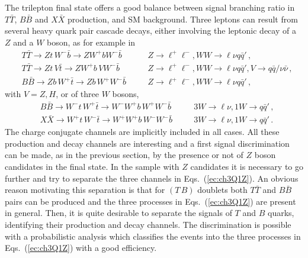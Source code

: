 \documentclass[12pt,a4paper]{article}
\newcommand{\TT}{T \bar T}
\newcommand{\BB}{B \bar B}
\newcommand{\XX}{X \bar X}
\newcommand{\HZ}{V}
\newcommand{\TB}{(T \, B)}
\begin{document}
The trilepton final state offers a good balance between signal branching ratio in $\TT$, $\BB$ and $\XX$ production, and SM background. Three leptons can result from several heavy quark pair cascade decays, either involving the leptonic decay of a $Z$ and a $W$ boson, as for example in
\begin{align}
& T \bar T \to Zt \, W^- \bar b \to Z W^+b W^- \bar b
&& \quad Z \to \ell^+ \ell^- , WW \to \ell \nu q \bar q' \,, \nonumber \\
& T \bar T \to Zt \, \HZ \bar t \to Z W^+b \, \HZ W^- \bar b
&& \quad Z \to \ell^+ \ell^- , WW \to \ell \nu q \bar q' , \HZ \to q \bar q/\nu \bar \nu \,, \nonumber \\
& B \bar B \to Z b \, W^+ \bar t \to Z b \, W^+ W^- \bar b
&& \quad Z \to \ell^+ \ell^- , WW \to \ell \nu q \bar q' \,, 
\label{ec:ch3Q1Z}
\end{align}
with $\HZ=Z,H$, or of three $W$ bosons,
\begin{align}
& B \bar B \to W^- t \, W^+ \bar t \to W^- W^+ b \, W^+ W^- \bar b
&& \quad 3W \to \ell \nu , 1W \to q \bar q' \,, \nonumber \\
& X \bar X \to W^+ t \, W^- \bar t \to W^+ W^+ b \, W^- W^- \bar b 
&& \quad 3W \to \ell \nu , 1W \to q \bar q' \,.
\label{ec:ch3Q1noZ}
\end{align}
The charge conjugate channels are implicitly included in all cases. All these production and decay channels are interesting and a first signal discrimination can be made, as in the previous section, by the presence or not of $Z$ boson candidates in the final state. 
In the sample with $Z$ candidates it is necessary to go further and try to separate the three channels in Eqs.~(\ref{ec:ch3Q1Z}). An obvious reason motivating this separation is that for $\TB$ doublets both $\TT$ and $\BB$ pairs can be produced and the three processes in Eqs.~(\ref{ec:ch3Q1Z}) are present in general. Then, it is quite desirable to separate the signals of $T$ and $B$ quarks, identifying their production and decay channels. The discrimination is possible with a probabilistic analysis which classifies the events into the three processes in Eqs.~(\ref{ec:ch3Q1Z}) with a good efficiency.
\end{document}
